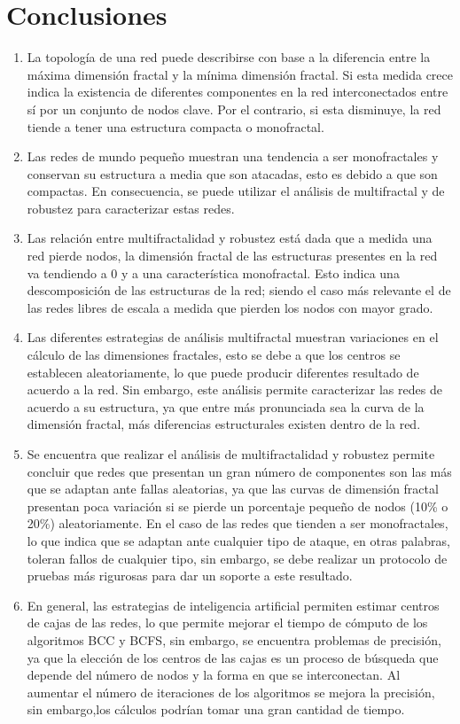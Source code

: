 \section{Conclusiones}

\begin{enumerate}
    \item La topología de una red puede describirse con base a la diferencia entre la máxima dimensión fractal y la mínima dimensión fractal. Si esta medida crece indica la existencia de diferentes componentes en la red interconectados entre sí por un conjunto de nodos clave. Por el contrario, si esta disminuye, la red tiende a tener una estructura compacta o monofractal.
    \item Las redes de mundo pequeño muestran una tendencia a ser monofractales y conservan su estructura a media que son atacadas, esto es debido a que son compactas. En consecuencia, se puede utilizar el análisis de multifractal y de robustez para caracterizar estas redes.
    \item Las relación entre multifractalidad y robustez está dada que a medida una red pierde nodos, la dimensión fractal de las estructuras presentes en la red va tendiendo a 0 y a una característica monofractal. Esto indica una descomposición de las estructuras de la red; siendo el caso más relevante el de las redes libres de escala a medida que pierden los nodos con mayor grado.
    \item Las diferentes estrategias de análisis multifractal muestran variaciones en el cálculo de las dimensiones fractales, esto se debe a que los centros se establecen aleatoriamente, lo que puede producir diferentes resultado de acuerdo a la red. Sin embargo, este análisis permite caracterizar las redes de acuerdo a su estructura, ya que entre más pronunciada sea la curva de la dimensión fractal, más diferencias estructurales existen dentro de la red.
    \item Se encuentra que realizar el análisis de multifractalidad y robustez permite concluir que redes que presentan un gran número de componentes son las más que se adaptan ante fallas aleatorias, ya que las curvas de dimensión fractal presentan poca variación si se pierde un porcentaje pequeño de nodos (10\% o 20\%) aleatoriamente. En el caso de las redes que tienden a ser monofractales, lo que indica que se adaptan ante cualquier tipo de ataque, en otras palabras, toleran fallos de cualquier tipo, sin embargo, se debe realizar un protocolo de pruebas más rigurosas para dar un soporte a este resultado.
    \item En general, las estrategias de inteligencia artificial permiten estimar centros de cajas de las redes, lo que permite mejorar el tiempo de cómputo de los algoritmos BCC y BCFS, sin embargo, se encuentra problemas de precisión, ya que la elección de los centros de las cajas es un proceso de búsqueda que depende del número de nodos y la forma en que se interconectan. Al aumentar el número de iteraciones de los algoritmos se mejora la precisión, sin embargo,los cálculos podrían tomar una gran cantidad de tiempo.

\end{enumerate}
